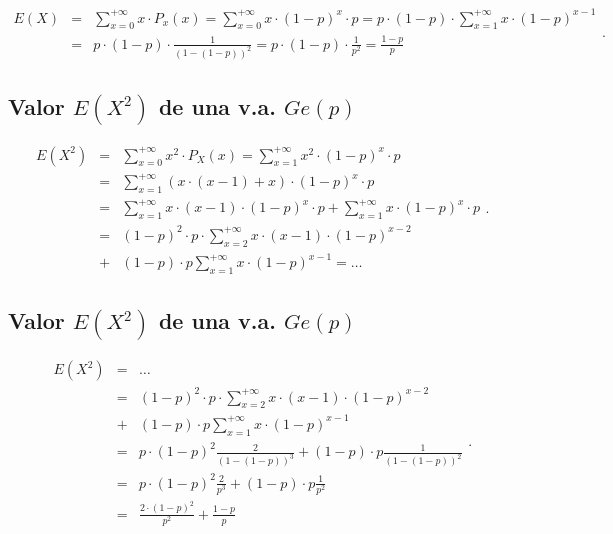 \documentclass[]{book}
\begin{document}
\[
\begin{eqnarray*}
E(X)&=&\sum_{x=0}^{+\infty} x\cdot P_x(x)=\sum_{x=0}^{+\infty} x\cdot (1-p)^x\cdot p=
p\cdot (1-p) \cdot \sum_{x=1}^{+\infty} x\cdot (1-p)^{x-1}\\
&=& p\cdot (1-p)\cdot \frac{1}{(1-(1-p))^2}=p\cdot (1-p)\cdot \frac{1}{p^2}=\frac{1-p}{p}
\end{eqnarray*}.
\]

\hypertarget{valor-ex2-de-una-v.a.-gep}{%
\subsection{\texorpdfstring{Valor \(E(X^2)\) de una v.a. \(Ge(p)\)}{Valor E(X\^{}2) de una v.a. Ge(p)}}\label{valor-ex2-de-una-v.a.-gep}}

\[
\begin{eqnarray*}
E(X^2)&=&\sum_{x=0}^{+\infty} x^2\cdot P_X(x)=\sum_{x=1}^{+\infty} x^2\cdot (1-p)^x\cdot p\\
&=& 
\sum_{x=1}^{+\infty} (x\cdot (x-1)+x)\cdot (1-p)^{x}\cdot p\\
&=&
\sum_{x=1}^{+\infty} x\cdot (x-1)\cdot (1-p)^{x}\cdot p+\sum_{x=1}^{+\infty} x \cdot (1-p)^{x}\cdot p\\
&=&
(1-p)^{2}\cdot p\cdot \sum_{x=2}^{+\infty} x\cdot (x-1)\cdot (1-p)^{x-2}\\ 
&  +&   (1-p)\cdot p\sum_{x=1}^{+\infty} x \cdot (1-p)^{x-1} = \ldots
\end{eqnarray*}.
\]

\hypertarget{valor-ex2-de-una-v.a.-gep-1}{%
\subsection{\texorpdfstring{Valor \(E(X^2)\) de una v.a. \(Ge(p)\)}{Valor E(X\^{}2) de una v.a. Ge(p)}}\label{valor-ex2-de-una-v.a.-gep-1}}

\[
\begin{eqnarray*}
E(X^2)&=&\ldots\\
&=&
(1-p)^{2}\cdot p\cdot \sum_{x=2}^{+\infty} x\cdot (x-1)\cdot (1-p)^{x-2}\\ 
&  +&   (1-p)\cdot p\sum_{x=1}^{+\infty} x \cdot (1-p)^{x-1}\\
&=&
p\cdot (1-p)^2 \frac{2}{(1-(1-p))^3}+  (1-p)\cdot p \frac{1}{(1-(1-p))^2}\\
&=&
p\cdot (1-p)^2 \frac{2}{p^3}+  (1-p)\cdot p \frac{1}{p^2}\\
&=&\frac{2\cdot (1-p)^2}{p^2}+\frac{1-p}{p}
\end{eqnarray*}.
\]
\end{document}
